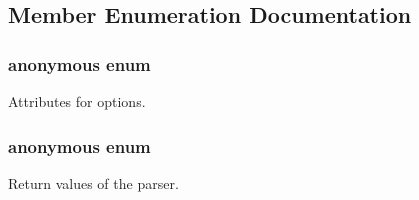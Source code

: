 \subsection{Member Enumeration Documentation}
\hypertarget{class_command_line_processing_1_1_argv_parser_af3a67d53589ab56056bbf717006be961}{\subsubsection[{anonymous enum}]{\setlength{\rightskip}{0pt plus 5cm}anonymous enum}}\label{class_command_line_processing_1_1_argv_parser_af3a67d53589ab56056bbf717006be961}
Attributes for options. \hypertarget{class_command_line_processing_1_1_argv_parser_a1f19664f2dfa74970d5bb2bd4e1d7773}{\subsubsection[{anonymous enum}]{\setlength{\rightskip}{0pt plus 5cm}anonymous enum}}\label{class_command_line_processing_1_1_argv_parser_a1f19664f2dfa74970d5bb2bd4e1d7773}
Return values of the parser. 

